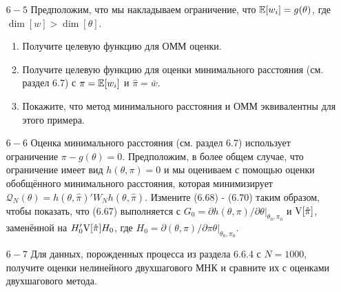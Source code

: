 \begin{enumerate}
\begin{enumerate}
\end{enumerate}
\item [$6 - 5$] Предположим, что мы накладываем ограничение, что $\mathbb{E}[w_i] = g(\theta)$, где $\dim[w] > \dim[\theta]$. 
\begin{enumerate}
\item Получите целевую функцию для ОММ оценки.
\item Получите целевую функцию для оценки минимального расстояния (см. раздел 6.7) с $\pi = \mathbb{E}[w_i]$ и $\hat{\pi} = \bar{w}$.
\item Покажите, что метод минимального расстояния и ОММ эквивалентны для этого примера.
\end{enumerate}
\item [$6 - 6$] Оценка минимального расстояния (см. раздел 6.7) использует ограничение $\pi-g(\theta)=0$. Предположим, в более общем случае, что ограничение имеет вид $h(\theta, \pi)=0$ и мы оцениваем с помощью оценки обобщённого минимального расстояния, которая минимизирует $\mathcal{Q}_{N}(\theta)=h(\theta, \hat{\pi})' W_N h(\theta, \hat{\pi})$. Измените (6.68) - (6.70) таким образом, чтобы показать, что (6.67) выполняется с $G_0= \partial h(\theta, \pi) / \partial \theta|_{\theta_0,\pi_0}$ и $\mathrm{V}[\hat{\pi}]$, заменённой на $H'_0 \mathrm{V}[\hat{\pi}] H_0$, где $H_0= \partial (\theta,\pi) / \partial \pi\theta|_{\theta_0,\pi_0}$.
\item [$6 - 7$] Для данных, порожденных процесса из раздела 6.6.4 с $N = 1 000$, получите оценки нелинейного двухшагового МНК и сравните их с оценками двухшагового метода.
\end{enumerate}

